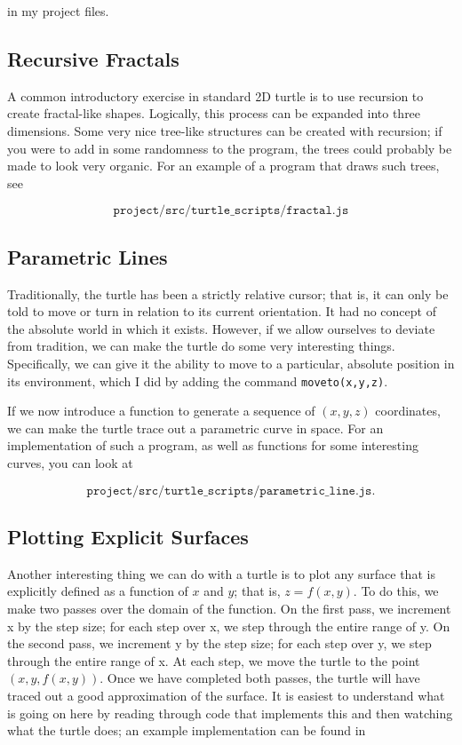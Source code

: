 \documentclass[12pt]{article}
\begin{document}
in my project files.

\subsection{Recursive Fractals}

A common introductory exercise in standard 2D turtle is to use recursion to create fractal-like shapes. Logically, this process can be expanded into three dimensions. Some very nice tree-like structures can be created with recursion; if you were to add in some randomness to the program, the trees could probably be made to look very organic. For an example of a program that draws such trees, see

\[\texttt{project/src/turtle\_scripts/fractal.js}\]

\subsection{Parametric Lines}

Traditionally, the turtle has been a strictly relative cursor; that is, it can only be told to move or turn in relation to its current orientation. It had no concept of the absolute world in which it exists. However, if we allow ourselves to deviate from tradition, we can make the turtle do some very interesting things. Specifically, we can give it the ability to move to a particular, absolute position in its environment, which I did by adding the command \texttt{moveto(x,y,z)}.

If we now introduce a function to generate a sequence of $(x, y, z)$ coordinates, we can make the turtle trace out a parametric curve in space. For an implementation of such a program, as well as functions for some interesting curves, you can look at

\[\texttt{project/src/turtle\_scripts/parametric\_line.js}.\]

\subsection{Plotting Explicit Surfaces}

Another interesting thing we can do with a turtle is to plot any surface that is explicitly defined as a function of $x$ and $y$; that is, $z = f(x,y)$. To do this, we make two passes over the domain of the function. On the first pass, we increment x by the step size; for each step over x, we step through the entire range of y. On the second pass, we increment y by the step size; for each step over y, we step through the entire range of x. At each step, we move the turtle to the point $(x, y, f(x, y))$. Once we have completed both passes, the turtle will have traced out a good approximation of the surface. It is easiest to understand what is going on here by reading through code that implements this and then watching what the turtle does; an example implementation can be found in
\end{document}
